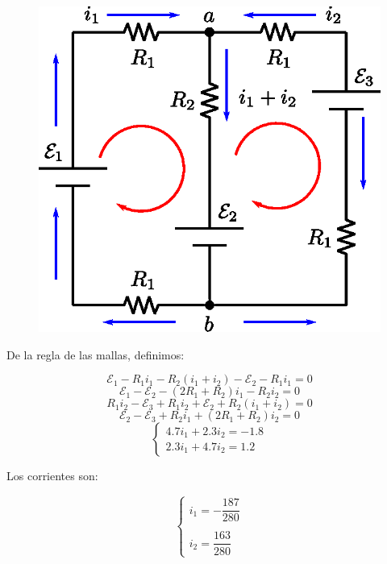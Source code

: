 \documentclass[letter,11pt]{article}
\begin{document}
\begin{enumerate}
\begin{figure}[!h]
\centering
\includegraphics[scale=0.74]{resources/a8.eps}
\end{figure}

De la regla de las mallas, definimos:

\begin{equation*}
    \mathcal{E}_1-R_1i_1-R_2(i_1+i_2)-\mathcal{E}_2-R_1i_1 = 0
\end{equation*}
\begin{equation*}
    \mathcal{E}_1-\mathcal{E}_2-(2R_1+R_2)i_1-R_2i_2 = 0
\end{equation*}
\begin{equation*}
    R_1i_2-\mathcal{E}_3+R_1i_2+\mathcal{E}_2+R_2(i_1+i_2) = 0
\end{equation*}
\begin{equation*}
    \mathcal{E}_2-\mathcal{E}_3+R_2i_1+(2R_1+R_2)i_2 = 0
\end{equation*}
\begin{equation*}
    \begin{cases}
        4.7i_1+2.3i_2 = -1.8 \\
        2.3i_1+4.7i_2 = 1.2
    \end{cases}
\end{equation*}

Los corrientes son:

\begin{equation*}
    \begin{cases}
        i_1 = -\dfrac{187}{280} \\
        \\
        i_2 = \dfrac{163}{280}
    \end{cases}
\end{equation*}


\end{enumerate}
\end{document}
